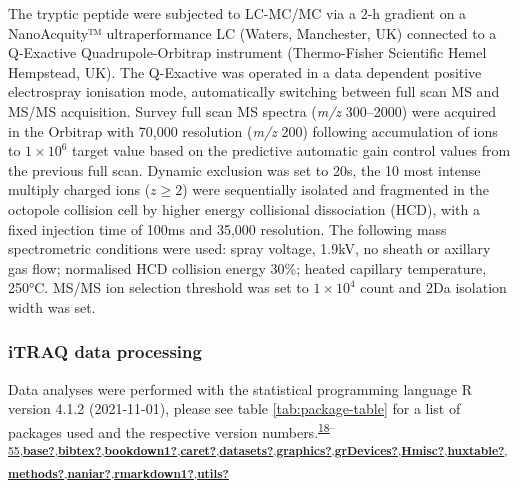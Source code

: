 \documentclass[
]{article}
\begin{document}
The tryptic peptide were subjected to LC-MC/MC via a 2-h gradient on a NanoAcquity™ ultraperformance LC (Waters, Manchester, UK) connected to a Q-Exactive Quadrupole-Orbitrap instrument (Thermo-Fisher Scientific Hemel Hempstead, UK).
The Q-Exactive was operated in a data dependent positive electrospray ionisation mode, automatically switching between full scan MS and MS/MS acquisition.
Survey full scan MS spectra (\emph{m/z} 300--2000) were acquired in the Orbitrap with 70,000 resolution (\emph{m/z} 200) following accumulation of ions to \(1\times 10^6\) target value based on the predictive automatic gain control values from the previous full scan.
Dynamic exclusion was set to 20s, the 10 most intense multiply charged ions (\(z \geq 2\)) were sequentially isolated and fragmented in the octopole collision cell by higher energy collisional dissociation (HCD), with a fixed injection time of 100ms and 35,000 resolution.
The following mass spectrometric conditions were used: spray voltage, 1.9kV, no sheath or axillary gas flow; normalised HCD collision energy 30\%; heated capillary temperature, 250°C.
MS/MS ion selection threshold was set to \(1\times 10^4\) count and 2Da isolation width was set.

\hypertarget{itraq-stats}{%
\subsubsection{iTRAQ data processing}\label{itraq-stats}}

Data analyses were performed with the statistical programming language R version 4.1.2 (2021-11-01), please see table \ref{tab:package-table} for a list of packages used and the respective version numbers.\textsuperscript{\protect\hyperlink{ref-BiocManager}{18}--\protect\hyperlink{ref-zoo}{55},\protect\hyperlink{ref-base}{\textbf{base?}},\protect\hyperlink{ref-bibtex}{\textbf{bibtex?}},\protect\hyperlink{ref-bookdown1}{\textbf{bookdown1?}},\protect\hyperlink{ref-caret}{\textbf{caret?}},\protect\hyperlink{ref-datasets}{\textbf{datasets?}},\protect\hyperlink{ref-graphics}{\textbf{graphics?}},\protect\hyperlink{ref-grDevices}{\textbf{grDevices?}},\protect\hyperlink{ref-Hmisc}{\textbf{Hmisc?}},\protect\hyperlink{ref-huxtable}{\textbf{huxtable?}},\protect\hyperlink{ref-methods}{\textbf{methods?}},\protect\hyperlink{ref-naniar}{\textbf{naniar?}},\protect\hyperlink{ref-rmarkdown1}{\textbf{rmarkdown1?}},\protect\hyperlink{ref-utils}{\textbf{utils?}}}
\end{document}

